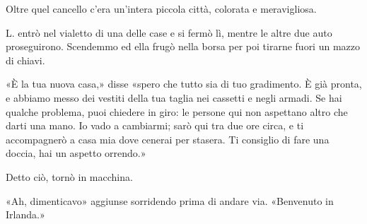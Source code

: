 \documentclass[a4paper,12pt]{book}
\begin{document}
Oltre quel cancello c’era un’intera piccola città, colorata e meravigliosa.

L. entrò nel vialetto di una delle case e si fermò lì, mentre le altre due
auto proseguirono. Scendemmo ed ella frugò nella borsa per poi tirarne fuori un
mazzo di chiavi.

«È la tua nuova casa,» disse «spero che tutto sia di tuo gradimento. È già
pronta, e abbiamo messo dei vestiti della tua taglia nei cassetti e negli
armadi. Se hai qualche problema, puoi chiedere in giro: le persone qui non
aspettano altro che darti una mano. Io vado a cambiarmi; sarò qui tra due ore
circa, e ti accompagnerò a casa mia dove cenerai per stasera. Ti consiglio di
fare una doccia, hai un aspetto orrendo.»

Detto ciò, tornò in macchina.

«Ah, dimenticavo» aggiunse sorridendo prima di andare via. «Benvenuto in
Irlanda.»

\tableofcontents
\end{document}
